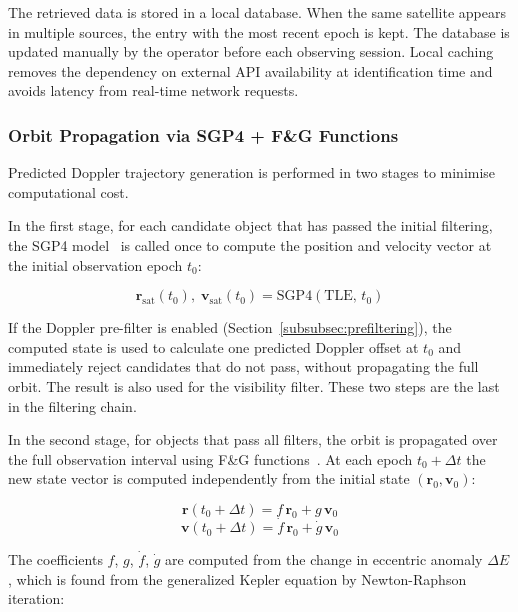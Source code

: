 \documentclass[lineno,pdflatex,sn-basic,referee,]{sn-jnl}
\begin{document}
The retrieved data is stored in a local database. When the same satellite appears in multiple sources, the entry with the most recent epoch is kept. The database is updated manually by the operator before each observing session. Local caching removes the dependency on external API availability at identification time and avoids latency from real-time network requests.


\subsubsection{Orbit Propagation via SGP4 + F\&G Functions}
\label{subsubsec:sgp4-fg}

Predicted Doppler trajectory generation is performed in two stages to minimise computational cost.

In the first stage, for each candidate object that has passed the initial filtering, the SGP4 model~\citep{vallado2006} is called once to compute the position and velocity vector at the initial observation epoch $t_0$:

\begin{equation}
    \mathbf{r}_{\mathrm{sat}}(t_0),\;\mathbf{v}_{\mathrm{sat}}(t_0)
    = \mathrm{SGP4}(\mathrm{TLE},\,t_0)
    \label{eq:sgp4-call}
\end{equation}

If the Doppler pre-filter is enabled (Section~\ref{subsubsec:prefiltering}), the computed state is used to calculate one predicted Doppler offset at $t_0$ and immediately reject candidates that do not pass, without propagating the full orbit. The result is also used for the visibility filter. These two steps are the last in the filtering chain.

In the second stage, for objects that pass all filters, the orbit is propagated over the full observation interval using F\&G functions~\citep{sharifi2011, seif2017}. At each epoch $t_0 + \Delta t$ the new state vector is computed independently from the initial state $(\mathbf{r}_0, \mathbf{v}_0)$:

\begin{equation}
    \mathbf{r}(t_0 + \Delta t) = f\,\mathbf{r}_0 + g\,\mathbf{v}_0
    \label{eq:fg-r}
\end{equation}
\begin{equation}
    \mathbf{v}(t_0 + \Delta t) = \dot{f}\,\mathbf{r}_0 + \dot{g}\,\mathbf{v}_0
    \label{eq:fg-v}
\end{equation}

The coefficients $f$, $g$, $\dot{f}$, $\dot{g}$ are computed from the change in eccentric anomaly $\Delta E$, which is found from the generalized Kepler equation by Newton-Raphson iteration:
\end{document}
